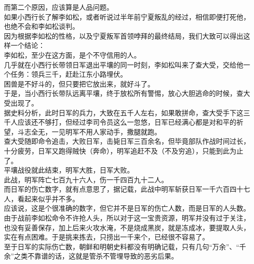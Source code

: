\begin{multicols}{\theparacolNo}
而第二个原因，应该算是人品问题。\\

如果小西行长了解李如松，或者听说过半年前宁夏叛乱的经过，相信即便打死他，也绝不会和李如松谈判。\\

因为根据李如松的性格，以及宁夏叛军首领哱拜的最终结局，我们大致可以得出这样一个结论：\\

李如松，至少在这方面，是个不守信用的人。\\

几乎就在小西行长带领日军退出平壤的同一时刻，李如松叫来了查大受，交给他一个任务：领兵三千，赶赴江东小路埋伏。\\

困兽是不好斗的，但只要把它放出来，就好斗了。\\

于是，当小西行长带队远离平壤，终于放松所有警惕，放心大胆逃命的时候，查大受出现了。\\

据史料分析，此时日军的兵力，大致在五千人左右，如果敢拼命，查大受手下这三千人应该还不够打，但经过李司令员这么一忽悠，日军已经满心都是对和平的祈望，斗志全无，一见明军不用人家动手，撒腿就跑。\\

查大受随即命令追击，大败日军，击毙日军三百余名，但毕竟部队作战时间过长，十分疲劳，日军又跑得贼快（奔命），明军追赶不及（不及穷追），只能到此为止了。\\

平壤战役就此结束，明军大胜，日军大败。\\

此战，明军阵亡七百九十六人，伤一千四百九十二人。\\

而日军的伤亡数字，就有点意思了，据记载，此战中明军斩获日军一千六百四十七人，看起来似乎并不多。\\

应该说，这是个很准确的数字，但它并不是日军的伤亡人数，而是日军的人头数。\\

由于战前李如松命令不许抢人头，所以对于这一宝贵资源，明军并没有过于关注，也没有妥善保存，加上后来火攻水淹，不是烧成黑炭，就是冻成冰，要提取人头，实在有点困难。于是挑来拣去，只捞出一千来个，已经很不容易了。\\

至于日军的实际伤亡数，朝鲜和明朝史料都没有明确记载，只有几句“万余”、“千余”之类不靠谱的话，这就是管杀不管埋导致的恶劣后果。\\


\end{multicols}
